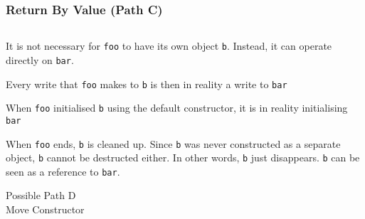 \begin{frame}
  \frametitle{Return By Value (Path C)}
  \begin{center}
    \begin{columns}
      \column{4cm}
      \column{4cm}
    \end{columns}
  \end{center}
  \vskip2mm
  \begin{overprint}
    \begin{center}
      It is not necessary for {\tt foo} to have its own object {\tt b}.
      Instead, it can operate directly on {\tt bar}.
    \end{center}

    \begin{center}
      Every write that {\tt foo} makes to {\tt b}
      is then in reality a write to {\tt bar}
    \end{center}

    \begin{center}
      When {\tt foo} initialised {\tt b} using the default constructor,
      it is in reality initialising {\tt bar}
    \end{center}

    \begin{center}
      When {\tt foo} ends, {\tt b} is cleaned up.
      Since {\tt b} was never constructed as a separate object, {\tt b} cannot be destructed either.
      In other words, {\tt b} just disappears. {\tt b} can be seen as a reference to {\tt bar}.
    \end{center}
  \end{overprint}
\end{frame}

\begin{frame}
  \begin{center} \Huge
    Possible Path D \\[4mm]
    Move Constructor
  \end{center}
\end{frame}

